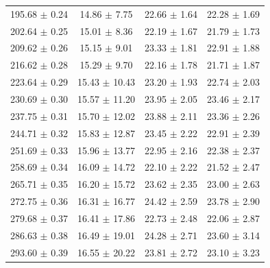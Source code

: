 \begin{table}[p]
\begin{tabular}{c c c c}
    195.68 $\pm$ 0.24 & 14.86 $\pm$ 7.75  & 22.66 $\pm$ 1.64 & 22.28 $\pm$ 1.69 \\
    202.64 $\pm$ 0.25 & 15.01 $\pm$ 8.36  & 22.19 $\pm$ 1.67 & 21.79 $\pm$ 1.73 \\
    209.62 $\pm$ 0.26 & 15.15 $\pm$ 9.01  & 23.33 $\pm$ 1.81 & 22.91 $\pm$ 1.88 \\
    216.62 $\pm$ 0.28 & 15.29 $\pm$ 9.70  & 22.16 $\pm$ 1.78 & 21.71 $\pm$ 1.87 \\
    223.64 $\pm$ 0.29 & 15.43 $\pm$ 10.43 & 23.20 $\pm$ 1.93 & 22.74 $\pm$ 2.03 \\
    230.69 $\pm$ 0.30 & 15.57 $\pm$ 11.20 & 23.95 $\pm$ 2.05 & 23.46 $\pm$ 2.17 \\
    237.75 $\pm$ 0.31 & 15.70 $\pm$ 12.02 & 23.88 $\pm$ 2.11 & 23.36 $\pm$ 2.26 \\
    244.71 $\pm$ 0.32 & 15.83 $\pm$ 12.87 & 23.45 $\pm$ 2.22 & 22.91 $\pm$ 2.39 \\
    251.69 $\pm$ 0.33 & 15.96 $\pm$ 13.77 & 22.95 $\pm$ 2.16 & 22.38 $\pm$ 2.37 \\
    258.69 $\pm$ 0.34 & 16.09 $\pm$ 14.72 & 22.10 $\pm$ 2.22 & 21.52 $\pm$ 2.47 \\
    265.71 $\pm$ 0.35 & 16.20 $\pm$ 15.72 & 23.62 $\pm$ 2.35 & 23.00 $\pm$ 2.63 \\
    272.75 $\pm$ 0.36 & 16.31 $\pm$ 16.77 & 24.42 $\pm$ 2.59 & 23.78 $\pm$ 2.90 \\
    279.68 $\pm$ 0.37 & 16.41 $\pm$ 17.86 & 22.73 $\pm$ 2.48 & 22.06 $\pm$ 2.87 \\
    286.63 $\pm$ 0.38 & 16.49 $\pm$ 19.01 & 24.28 $\pm$ 2.71 & 23.60 $\pm$ 3.14 \\
    293.60 $\pm$ 0.39 & 16.55 $\pm$ 20.22 & 23.81 $\pm$ 2.72 & 23.10 $\pm$ 3.23 \\
    \bottomrule
  \end{tabular}
\end{table}

